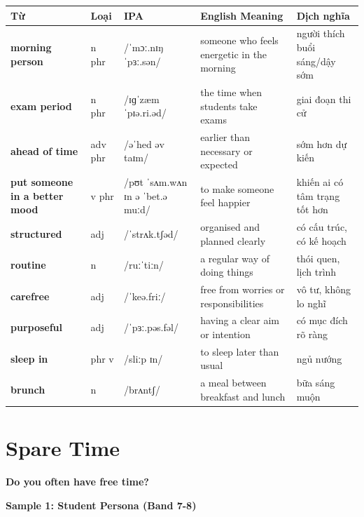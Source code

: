 \vspace{0.8em}
\begin{center}
\renewcommand{\arraystretch}{1.65}
\begin{tabularx}{\textwidth}{|V{0.22\textwidth}|C{0.07\textwidth}|I{0.20\textwidth}|Y|V{0.18\textwidth}|}
\hline
{}
\textbf{Từ} & \textbf{Loại} & \textbf{IPA} & \textbf{English Meaning} & \textbf{Dịch nghĩa} \\
\hline
\textbf{morning person} & n phr & /ˈmɔː.nɪŋ ˈpɜː.sən/ & someone who feels energetic in the morning & người thích buổi sáng/dậy sớm \\ \hline
\textbf{exam period} & n phr & /ɪɡˈzæm ˈpɪə.ri.əd/ & the time when students take exams & giai đoạn thi cử \\ \hline
\textbf{ahead of time} & adv phr & /əˈhed əv taɪm/ & earlier than necessary or expected & sớm hơn dự kiến \\ \hline
\textbf{put someone in a better mood} & v phr & /pʊt ˈsʌm.wʌn ɪn ə ˈbet.ə muːd/ & to make someone feel happier & khiến ai có tâm trạng tốt hơn \\ \hline
\textbf{structured} & adj & /ˈstrʌk.tʃəd/ & organised and planned clearly & có cấu trúc, có kế hoạch \\ \hline
\textbf{routine} & n & /ruːˈtiːn/ & a regular way of doing things & thói quen, lịch trình \\ \hline
\textbf{carefree} & adj & /ˈkeə.friː/ & free from worries or responsibilities & vô tư, không lo nghĩ \\ \hline
\textbf{purposeful} & adj & /ˈpɜː.pəs.fəl/ & having a clear aim or intention & có mục đích rõ ràng \\ \hline
\textbf{sleep in} & phr v & /sliːp ɪn/ & to sleep later than usual & ngủ nướng \\ \hline
\textbf{brunch} & n & /brʌntʃ/ & a meal between breakfast and lunch & bữa sáng muộn \\ \hline
\end{tabularx}
\end{center}

\newpage

\section{Spare Time}
\begin{ieltsquestion}
\textbf{Do you often have free time?}
\end{ieltsquestion}
\textbf{Sample 1: Student Persona (Band 7-8)}


